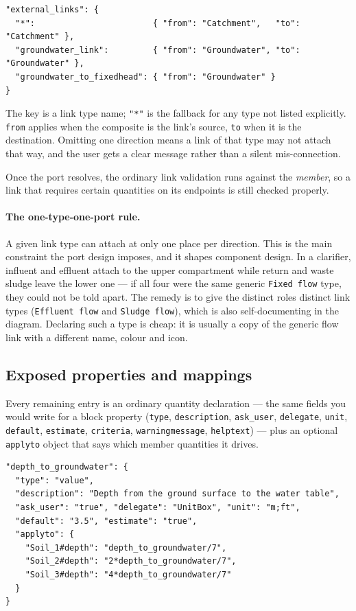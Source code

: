 \documentclass[11pt,a4paper]{article}
\newcommand{\code}[1]{\texttt{\small #1}}
\begin{document}
\begin{lstlisting}
"external_links": {
  "*":                        { "from": "Catchment",   "to": "Catchment" },
  "groundwater_link":         { "from": "Groundwater", "to": "Groundwater" },
  "groundwater_to_fixedhead": { "from": "Groundwater" }
}
\end{lstlisting}

\noindent
The key is a link type name; \code{"*"} is the fallback for any type not listed
explicitly. \code{from} applies when the composite is the link's source,
\code{to} when it is the destination. Omitting one direction means a link of
that type may not attach that way, and the user gets a clear message rather
than a silent mis-connection.

Once the port resolves, the ordinary link validation runs against the
\emph{member}, so a link that requires certain quantities on its endpoints is
still checked properly.

\paragraph{The one-type-one-port rule.}
A given link type can attach at only one place per direction. This is the main
constraint the port design imposes, and it shapes component design. In a
clarifier, influent and effluent attach to the upper compartment while return
and waste sludge leave the lower one --- if all four were the same generic
\code{Fixed flow} type, they could not be told apart. The remedy is to give the
distinct roles distinct link types (\code{Effluent flow} and
\code{Sludge flow}), which is also self-documenting in the diagram. Declaring
such a type is cheap: it is usually a copy of the generic flow link with a
different name, colour and icon.

\subsection{Exposed properties and mappings}\label{sec:mappings}

Every remaining entry is an ordinary quantity declaration --- the same fields
you would write for a block property (\code{type}, \code{description},
\code{ask\_user}, \code{delegate}, \code{unit}, \code{default},
\code{estimate}, \code{criteria}, \code{warningmessage}, \code{helptext}) ---
plus an optional \code{applyto} object that says which member quantities it
drives.

\begin{lstlisting}
"depth_to_groundwater": {
  "type": "value",
  "description": "Depth from the ground surface to the water table",
  "ask_user": "true", "delegate": "UnitBox", "unit": "m;ft",
  "default": "3.5", "estimate": "true",
  "applyto": {
    "Soil_1#depth": "depth_to_groundwater/7",
    "Soil_2#depth": "2*depth_to_groundwater/7",
    "Soil_3#depth": "4*depth_to_groundwater/7"
  }
}
\end{lstlisting}
\end{document}
